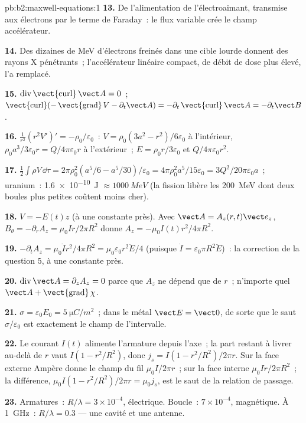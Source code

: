 \begin{solution}{pb:b2:maxwell-equations:1}
\textbf{13.} De l'alimentation de l'électroaimant, transmise aux électrons par
le terme de Faraday~: le flux variable crée le champ accélérateur.

\textbf{14.} Des dizaines de MeV d'électrons freinés dans une cible lourde donnent des
rayons X pénétrants~; l'accélérateur linéaire compact, de débit de dose plus élevé,
l'a remplacé.

\textbf{15.} $\operatorname{div}\operatorname{\vect{curl}}\vect A = 0$~; $\operatorname{\vect{curl}}(-\operatorname{\vect{grad}}
V - \partial_t\vect A) = -\partial_t\operatorname{\vect{curl}}\vect A = -\partial_t\vect B$.

\textbf{16.} $\frac1{r^2}(r^2V')' = -\rho_0/\varepsilon_0$~: $V = \rho_0(3a^2 - r^2)/6\varepsilon_0$
à l'intérieur, $\rho_0a^3/3\varepsilon_0r = Q/4\pi\varepsilon_0r$ à l'extérieur~; $E = \rho_0r/3\varepsilon_0$ et
$Q/4\pi\varepsilon_0r^2$.

\textbf{17.} $\tfrac12\int\rho V\,\dd\tau = 2\pi\rho_0^2(a^5/6 - a^5/30)/\varepsilon_0 = 4\pi\rho_0^2a^5/
15\varepsilon_0 = 3Q^2/20\pi\varepsilon_0a$~; uranium~: \qty{1.6e-10}{J} $\approx \qty{1000}{MeV}$ (la fission
libère les \qty{200}{MeV} dont deux boules plus petites coûtent moins cher).

\textbf{18.} $V = -E(t)z$ (à une constante près). Avec $\vect A = A_z(r, t)\vect e_z$,
$B_\theta = -\partial_rA_z = \mu_0Ir/2\pi R^2$ donne $A_z = -\mu_0I(t)r^2/4\pi R^2$.

\textbf{19.} $-\partial_tA_z = \mu_0\dot Ir^2/4\pi R^2 = \mu_0\varepsilon_0r^2\ddot E/4$ (puisque $\dot I =
\varepsilon_0\pi R^2\ddot E$)~: la correction de la question 5, à une constante près.

\textbf{20.} $\operatorname{div}\vect A = \partial_zA_z = 0$ parce que $A_z$ ne dépend que de
$r$~; n'importe quel $\vect A + \operatorname{\vect{grad}}\chi$.

\textbf{21.} $\sigma = \varepsilon_0E_0 = \qty{5}{\micro C/m^2}$~; dans le métal $\vect E =
\vect 0$, de sorte que le saut $\sigma/\varepsilon_0$ est exactement le champ de l'intervalle.

\textbf{22.} Le courant $I(t)$ alimente l'armature depuis l'axe~; la
part restant à livrer au-delà de $r$ vaut $I(1 - r^2/R^2)$, donc $j_s = I(1 -
r^2/R^2)/2\pi r$. Sur la face externe Ampère donne le champ du fil $\mu_0I/
2\pi r$~; sur la face interne $\mu_0Ir/2\pi R^2$~; la différence, $\mu_0I(1 -
r^2/R^2)/2\pi r = \mu_0j_s$, est le saut de la relation de passage.

\textbf{23.} Armatures~: $R/\lambda = 3 \times 10^{-4}$,  électrique. Boucle~: $7 \times 10^{-4}$,
 magnétique. À \qty{1}{GHz}~: $R/\lambda = 0.3$ --- une cavité et une antenne.


\end{solution}
